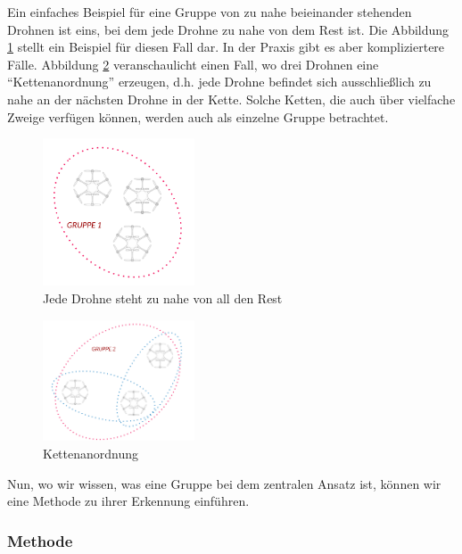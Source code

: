 \documentclass[a4paper,titlepage,onecolumn,twoside,12pt]{article}
\begin{document}
Ein einfaches Beispiel für eine Gruppe von zu nahe beieinander stehenden Drohnen ist eins, bei dem jede Drohne zu nahe von dem Rest ist. Die Abbildung \ref{fig:gruppenerkennung_beispiele1} stellt ein Beispiel für diesen Fall dar. In der Praxis gibt es aber kompliziertere Fälle. Abbildung \ref{fig:gruppenerkennung_beispiele2} veranschaulicht einen Fall, wo drei Drohnen eine "`Kettenanordnung"' erzeugen, d.h. jede Drohne befindet sich ausschließlich zu nahe an der nächsten Drohne in der Kette. Solche Ketten, die auch über vielfache Zweige verfügen können, werden auch als einzelne Gruppe betrachtet.

\begin{figure}
\centering
\includegraphics[width = 0.4\textwidth]{Gruppenerkennung_beispiele1}
\caption{Jede Drohne steht zu nahe von all den Rest}
\label{fig:gruppenerkennung_beispiele1}
\end{figure}

\begin{figure}
\centering
\includegraphics[width = 0.4\textwidth]{Gruppenerkennung_beispiele2}
\caption{Kettenanordnung}
\label{fig:gruppenerkennung_beispiele2}
\end{figure}


Nun, wo wir wissen, was eine Gruppe bei dem zentralen Ansatz ist, können wir eine Methode zu ihrer Erkennung einführen.

\subsubsection{Methode}
\label{subsubsec:methode}
\end{document}
